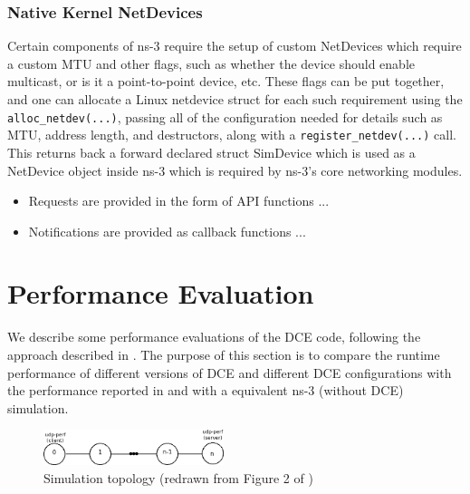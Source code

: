 \documentclass{sig-alternate}
\begin{document}
\subsubsection{Native Kernel NetDevices}
Certain components of ns-3 require the setup of custom NetDevices which require a custom MTU and other flags, such as whether the device should enable multicast, 
or is it a point-to-point device, etc. These flags can be put together, and one can allocate a Linux netdevice struct for each such requirement using
the \texttt{alloc\_netdev(...)}, passing all of the configuration needed for details such as MTU, address length, and destructors, along with a \texttt{register\_netdev(...)} call.
This returns back a forward declared struct SimDevice which is used as a NetDevice object inside ns-3 which is required by ns-3's core networking modules.

\begin{itemize}
 \item Requests are provided in the form of API functions ...
 \item Notifications are provided as callback functions ...
\end{itemize}

\section{Performance Evaluation}
We describe some performance evaluations of the DCE code, following the
approach described in \cite{Tazaki13}.  The purpose of this section is to
compare the runtime performance of different versions of DCE and different
DCE configurations with the performance reported in \cite{Tazaki13} and with
a equivalent ns-3 (without DCE) simulation.

\begin{figure}[h!]
  \centering
    \includegraphics[width=0.47\textwidth]{figs/topology.png}
  \caption{Simulation topology (redrawn from Figure 2 of \cite{Tazaki13})}
  \label{fig:topology}
\end{figure}
\end{document}
